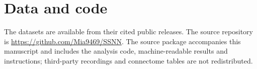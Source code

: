 \documentclass[aps,10pt,onecolumn,superscriptaddress,nofootinbib,
  longbibliography,amsmath,amssymb,floatfix]{revtex4-2}
\begin{document}
\FloatBarrier

\FloatBarrier
\section*{Data and code}
The datasets are available from their cited public releases. The source
repository is \url{https://github.com/Mia9469/SSNN}. The source package
accompanies this manuscript and includes the analysis code,
machine-readable results and instructions; third-party recordings and
connectome tables are not redistributed.



\end{document}
